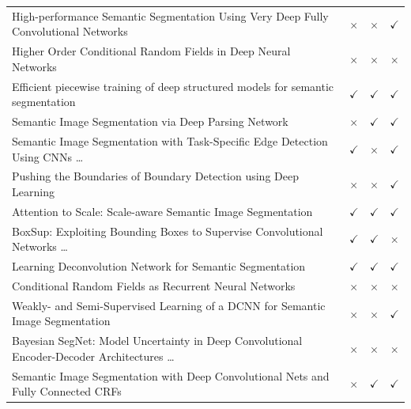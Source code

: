 \documentclass[runningheads]{llncs}
\begin{document}
\begin{table}[ht]
{\begin{tabular}{lccc}
\normalsize High-performance Semantic Segmentation Using Very Deep Fully Convolutional Networks&\cellcolor{red!20}$\times$&\cellcolor{red!20}$\times$&\cellcolor{green!20}$\checkmark$\\
\normalsize Higher Order Conditional Random Fields in Deep Neural Networks&\cellcolor{red!20}$\times$&\cellcolor{red!20}$\times$&\cellcolor{red!20}$\times$\\
\normalsize Efficient piecewise training of deep structured models for semantic segmentation&\cellcolor{green!20}$\checkmark$&\cellcolor{green!20}$\checkmark$&\cellcolor{green!20}$\checkmark$\\
\normalsize Semantic Image Segmentation via Deep Parsing Network&\cellcolor{red!20}$\times$&\cellcolor{green!20}$\checkmark$&\cellcolor{green!20}$\checkmark$\\
\normalsize Semantic Image Segmentation with Task-Specific Edge Detection Using CNNs \dots &\cellcolor{green!20}$\checkmark$&\cellcolor{red!20}$\times$&\cellcolor{green!20}$\checkmark$\\
\normalsize Pushing the Boundaries of Boundary Detection using Deep Learning&\cellcolor{red!20}$\times$&\cellcolor{red!20}$\times$&\cellcolor{green!20}$\checkmark$\\
\normalsize Attention to Scale: Scale-aware Semantic Image Segmentation&\cellcolor{green!20}$\checkmark$&\cellcolor{green!20}$\checkmark$&\cellcolor{green!20}$\checkmark$\\
\normalsize BoxSup: Exploiting Bounding Boxes to Supervise Convolutional Networks \dots &\cellcolor{green!20}$\checkmark$&\cellcolor{green!20}$\checkmark$&\cellcolor{red!20}$\times$\\
\normalsize Learning Deconvolution Network for Semantic Segmentation&\cellcolor{green!20}$\checkmark$&\cellcolor{green!20}$\checkmark$&\cellcolor{green!20}$\checkmark$\\
\normalsize Conditional Random Fields as Recurrent Neural Networks&\cellcolor{red!20}$\times$&\cellcolor{red!20}$\times$&\cellcolor{red!20}$\times$\\
\normalsize Weakly- and Semi-Supervised Learning of a DCNN for Semantic Image Segmentation&\cellcolor{red!20}$\times$&\cellcolor{red!20}$\times$&\cellcolor{green!20}$\checkmark$\\
\normalsize Bayesian SegNet: Model Uncertainty in Deep Convolutional Encoder-Decoder Architectures \dots &\cellcolor{red!20}$\times$&\cellcolor{red!20}$\times$&\cellcolor{red!20}$\times$\\
\normalsize Semantic Image Segmentation with Deep Convolutional Nets and Fully Connected CRFs&\cellcolor{red!20}$\times$&\cellcolor{green!20}$\checkmark$&\cellcolor{green!20}$\checkmark$\\

\end{tabular}}
\end{table}
\end{document}
